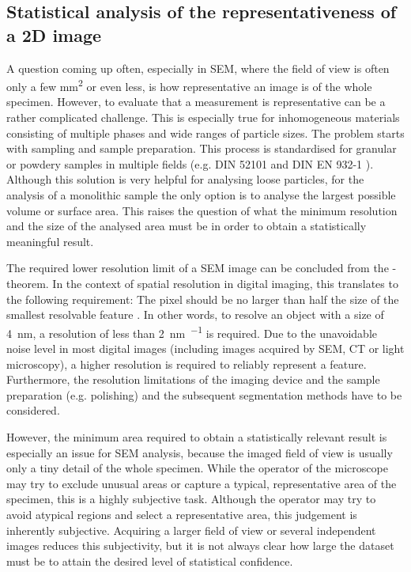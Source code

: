 \subsection{Statistical analysis of the representativeness of a 2D image}
\label{sec:2D-representativeness}

A question coming up often, especially in \ac{SEM}, where the field of view is often only a few \unit{\milli\meter\squared} or even less, is how representative an image is of the whole specimen.
However, to evaluate that a measurement is representative can be a rather complicated challenge.
This is especially true for inhomogeneous materials consisting of multiple phases and wide ranges of particle sizes.
The problem starts with sampling and sample preparation.
This process is standardised for granular or powdery samples in multiple fields (e.g. DIN 52101 \cite{din52101.2013} and DIN EN 932-1 \cite{dinen932-1.1996}).
Although this solution is very helpful for analysing loose particles, for the analysis of a monolithic sample the only option is to analyse the largest possible volume or surface area.
This raises the question of what the minimum resolution and the size of the analysed area must be in order to obtain a statistically meaningful result.

The required lower resolution limit of a \ac{SEM} image can be concluded from the \textcite{nyquist.1928}-\textcite{shannon.1949} theorem. %
In the context of spatial resolution in digital imaging, this translates to the following requirement:
The pixel should be no larger than half the size of the smallest resolvable feature \cite{roberge.2022}.
In other words, to resolve an object with a size of \qty{4}{\nano\meter}, a resolution of less than \qty{2}{\nano\meter\per\px} is required.
Due to the unavoidable noise level in most digital images (including images acquired by \ac{SEM}, \ac{CT} or light microscopy), a higher resolution is required to reliably represent a feature.
Furthermore, the resolution limitations of the imaging device and the sample preparation (e.g. polishing) and the subsequent segmentation methods have to be considered.

However, the minimum area required to obtain a statistically relevant result is especially an issue for \ac{SEM} analysis, because the imaged field of view is usually only a tiny detail of the whole specimen.
While the operator of the microscope may try to exclude unusual areas or capture a typical, representative area of the specimen, this is a highly subjective task.
Although the operator may try to avoid atypical regions and select a representative area, this judgement is inherently subjective.
Acquiring a larger field of view or several independent images reduces this subjectivity, but it is not always clear how large the dataset must be to attain the desired level of statistical confidence.

